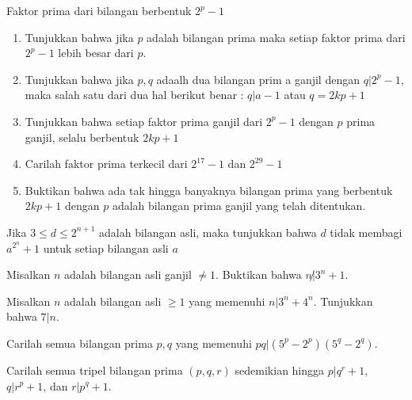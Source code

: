 \documentclass[11pt]{scrartcl}
\begin{document}
\begin{problem}
    Faktor prima dari bilangan berbentuk $2^p - 1$
    \begin{enumerate}
        \item Tunjukkan bahwa jika $p$ adalah bilangan prima maka setiap faktor prima dari $2^p - 1$ lebih besar dari $p$.
        \item Tunjukkan bahwa jika $p,q$ adaalh dua bilangan prim a ganjil dengan $q|2^p - 1$, maka salah satu dari dua hal berikut benar : $q|a - 1$ atau $q = 2kp + 1$
        \item Tunjukkan bahwa setiap faktor prima ganjil dari $2^p - 1$ dengan $p$ prima ganjil, selalu berbentuk $2kp + 1$
        \item Carilah faktor prima terkecil dari $2^{17} - 1$ dan $2^{29} - 1$
        \item Buktikan bahwa ada tak hingga banyaknya bilangan prima yang berbentuk $2kp + 1$ dengan $p$ adalah bilangan prima ganjil yang telah ditentukan.
    \end{enumerate}
\end{problem}

\begin{problem}
    Jika $3 \leq d \leq 2^{n + 1}$ adalah bilangan asli, maka tunjukkan bahwa $d$ tidak membagi $a^{2^n} + 1$ untuk setiap bilangan asli $a$
\end{problem}

\begin{problem}
   Misalkan $n$ adalah bilangan asli ganjil $\neq 1$. Buktikan bahwa $n \not| 3^n + 1$. 
\end{problem}

\begin{problem}
    Misalkan $n$ adalah bilangan asli $\geq 1$ yang memenuhi $n | 3^n + 4^n$. Tunjukkan bahwa $7|n$.
\end{problem}

\begin{problem}
    Carilah semua bilangan prima $p,q$ yang memenuhi $pq| (5^p - 2^p)(5^q - 2^q)$.
\end{problem}

\begin{problem}
    Carilah semua tripel bilangan prima $(p,q,r)$ sedemikian hingga $p| q^r + 1$, $q| r^p + 1$, dan $r| p^q + 1$.
\end{problem}
\end{document}
